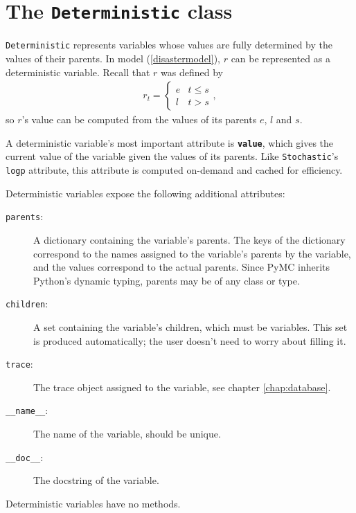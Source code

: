 \section{The \texttt{Deterministic} class}\label{dtrm}

\texttt{Deterministic} represents variables whose values are fully determined by the values of their parents. In model (\ref{disastermodel}), $r$ can be represented as a deterministic variable. Recall that $r$ was defined by
\begin{eqnarray*}
    r_t=\left\{\begin{array}{ll}
        e & t\le s\\ l & t>s
        \end{array}\right.,
\end{eqnarray*}
so $r$'s value can be computed from the values of its parents $e$, $l$ and $s$.

A deterministic variable's most important attribute is \texttt{\bfseries value}, which gives the current value of the variable given the values of its parents. Like \texttt{Stochastic}'s \texttt{logp} attribute, this attribute is computed on-demand and cached for efficiency.

Deterministic variables expose the following additional attributes:
\begin{description}
    \item[\texttt{parents}:] A dictionary containing the variable's parents. The keys of the dictionary correspond to the names assigned to the variable's parents by the variable, and the values correspond to the actual parents. Since PyMC inherits Python's dynamic typing, parents may be of any class or type.
    \item[\texttt{children}:] A set containing the variable's children, which must be variables. This set is produced automatically; the user doesn't need to worry about filling it.
    \item[\texttt{trace}:] The trace object assigned to the variable, see chapter \ref{chap:database}.
    \item[\texttt{\_\_name\_\_}:] The name of the variable, should be unique.
    \item[\texttt{\_\_doc\_\_}:] The docstring of the variable.
\end{description}
Deterministic variables have no methods.

